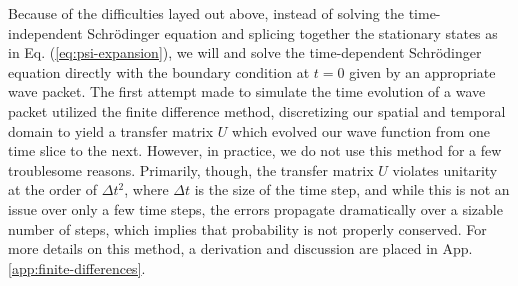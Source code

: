 Because of the difficulties layed out above, instead of solving the time-independent Schr\"{o}dinger equation and splicing together the stationary states as in Eq. (\ref{eq:psi-expansion}), we will and solve the time-dependent Schr\"{o}dinger equation directly with the boundary condition at $t = 0$ given by an appropriate wave packet.
The first attempt made to simulate the time evolution of a wave packet utilized the finite difference method, discretizing our spatial and temporal domain to yield a transfer matrix $U$ which evolved our wave function from one time slice to the next.
However, in practice, we do not use this method for a few troublesome reasons.
Primarily, though, the transfer matrix $U$ violates unitarity at the order of $\Delta t^2$, where $\Delta t$ is the size of the time step, and while this is not an issue over only a few time steps, the errors propagate dramatically over a sizable number of steps, which implies that probability is not properly conserved.
For more details on this method, a derivation and discussion are placed in App. \ref{app:finite-differences}.

